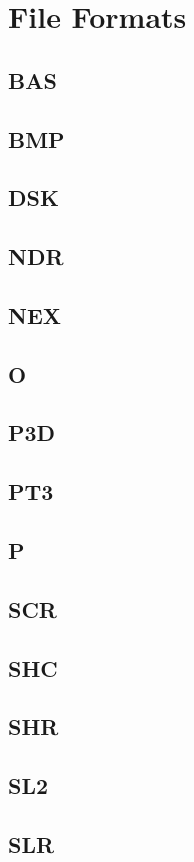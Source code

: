 \chapter{File Formats}
\section{BAS}
\section{BMP}
\section{DSK}
\section{NDR}
\section{NEX}
\section{O}
\section{P3D}
\section{PT3}
\section{P}
\section{SCR}
\section{SHC}
\section{SHR}
\section{SL2}
\section{SLR}
